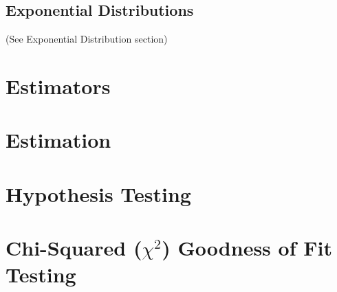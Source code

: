     \subsection{Exponential Distributions}
        (See Exponential Distribution section)

\section{Estimators}
\section{Estimation}
\section{Hypothesis Testing}
\section{Chi-Squared ($\chi^2$) Goodness of Fit Testing}
